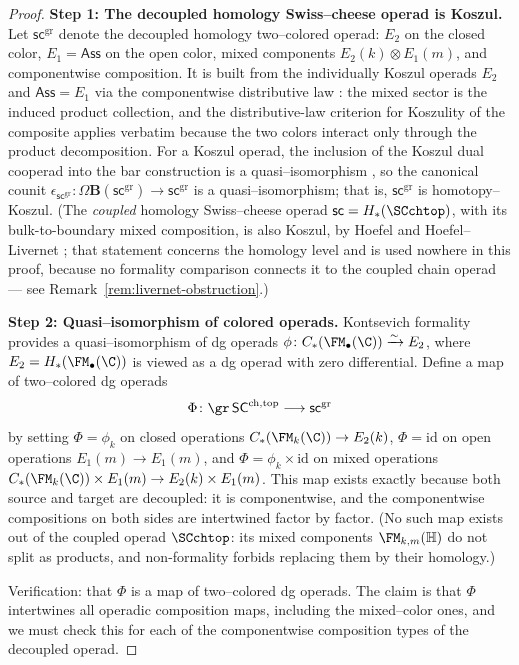 \begin{proof}
\textbf{Step 1: The decoupled homology Swiss--cheese operad is
Koszul.}
Let $\mathsf{sc}^{\mathrm{gr}}$ denote the decoupled homology
two--colored operad: $E_2$ on the closed color, $E_1 = \mathsf{Ass}$
on the open color, mixed components $E_2(k) \otimes E_1(m)$, and
componentwise composition. It is built from the individually Koszul
operads $E_2$ \cite{GK94} and $\mathsf{Ass} = E_1$ \cite{GK94} via
the componentwise distributive law \cite{Val07}: the mixed sector is
the induced product collection, and the distributive-law criterion
for Koszulity of the composite applies verbatim because the two
colors interact only through the product decomposition. For a Koszul
operad, the inclusion of the Koszul dual cooperad into the bar
construction is a quasi--isomorphism \cite{GK94}, so the canonical
counit $\epsilon_{\mathsf{sc}^{\mathrm{gr}}} \colon
\Omega\mathbf{B}(\mathsf{sc}^{\mathrm{gr}}) \to
\mathsf{sc}^{\mathrm{gr}}$ is a quasi--isomorphism; that is,
$\mathsf{sc}^{\mathrm{gr}}$ is homotopy--Koszul. (The
\emph{coupled} homology Swiss--cheese operad
$\mathsf{sc} = H_\ast(\SCchtop)$, with its bulk-to-boundary mixed
composition, is also Koszul, by Hoefel and Hoefel--Livernet
\cite{Vor99,Hoe09,HL12}; that statement concerns the homology
level and is used nowhere in this proof, because no formality
comparison connects it to the coupled chain operad --- see
Remark~\ref{rem:livernet-obstruction}.)

\textbf{Step 2: Quasi--isomorphism of colored operads.}
Kontsevich formality \cite{Kon03} provides a quasi--isomorphism of dg
operads $\phi \colon C_\ast(\FM_\bullet(\C)) \xrightarrow{\sim} E_2$,
where $E_2 = H_\ast(\FM_\bullet(\C))$ is viewed as a dg operad with
zero differential. Define a map of two--colored dg operads
\[
 \Phi \colon \gr\,\mathsf{SC}^{\mathrm{ch,top}} \longrightarrow \mathsf{sc}^{\mathrm{gr}}
\]
by setting $\Phi = \phi_k$ on closed operations
$C_\ast(\FM_k(\C)) \to E_2(k)$, $\Phi = \mathrm{id}$ on open operations
$E_1(m) \to E_1(m)$, and $\Phi = \phi_k \times \mathrm{id}$ on mixed
operations
$C_\ast(\FM_k(\C)) \times E_1(m) \to E_2(k) \times E_1(m)$. This map
exists exactly because both source and target are decoupled: it is
componentwise, and the componentwise compositions on both sides are
intertwined factor by factor. (No such map exists out of the coupled
operad $\SCchtop$: its mixed components $\FM_{k,m}(\mathbb H)$ do
not split as products, and non-formality forbids replacing them by
their homology.)

Verification: that $\Phi$ is a map of two--colored dg operads. The claim is
that $\Phi$ intertwines all operadic composition maps, including the
mixed--color ones, and we must check this for each of the
componentwise composition types of the decoupled operad.


\end{proof}
